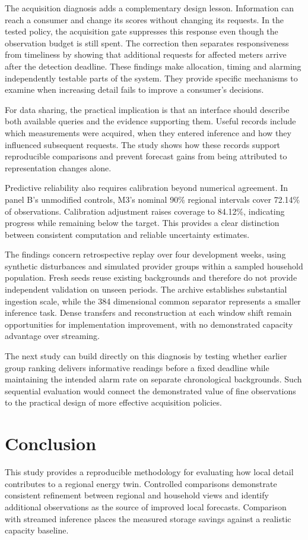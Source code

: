 \documentclass[conference]{IEEEtran}
\begin{document}
The acquisition diagnosis adds a complementary design lesson. Information can reach a consumer and change its scores without changing its requests. In the tested policy, the acquisition gate suppresses this response even though the observation budget is still spent. The correction then separates responsiveness from timeliness by showing that additional requests for affected meters arrive after the detection deadline. These findings make allocation, timing and alarming independently testable parts of the system. They provide specific mechanisms to examine when increasing detail fails to improve a consumer's decisions.

For data sharing, the practical implication is that an interface should describe both available queries and the evidence supporting them. Useful records include which measurements were acquired, when they entered inference and how they influenced subsequent requests. The study shows how these records support reproducible comparisons and prevent forecast gains from being attributed to representation changes alone.

\balance
Predictive reliability also requires calibration beyond numerical agreement. In panel B's unmodified controls, M3's nominal 90\% regional intervals cover 72.14\% of observations. Calibration adjustment raises coverage to 84.12\%, indicating progress while remaining below the target. This provides a clear distinction between consistent computation and reliable uncertainty estimates.

The findings concern retrospective replay over four development weeks, using synthetic disturbances and simulated provider groups within a sampled household population. Fresh seeds reuse existing backgrounds and therefore do not provide independent validation on unseen periods. The archive establishes substantial ingestion scale, while the 384 dimensional common separator represents a smaller inference task. Dense transfers and reconstruction at each window shift remain opportunities for implementation improvement, with no demonstrated capacity advantage over streaming.

The next study can build directly on this diagnosis by testing whether earlier group ranking delivers informative readings before a fixed deadline while maintaining the intended alarm rate on separate chronological backgrounds. Such sequential evaluation would connect the demonstrated value of fine observations to the practical design of more effective acquisition policies.


\section{Conclusion}
This study provides a reproducible methodology for evaluating how local detail contributes to a regional energy twin. Controlled comparisons demonstrate consistent refinement between regional and household views and identify additional observations as the source of improved local forecasts. Comparison with streamed inference places the measured storage savings against a realistic capacity baseline.
\end{document}
